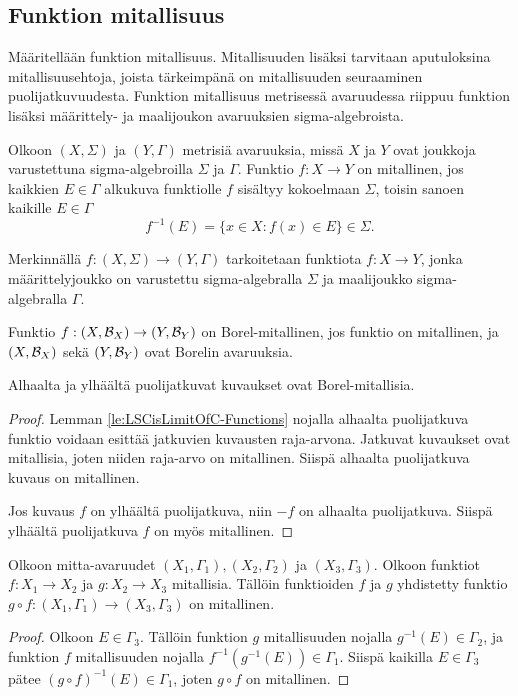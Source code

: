 \documentclass[12pt,oneside,a4paper]{amsbook} %
\begin{document}
\subsection{Funktion mitallisuus}
Määritellään funktion mitallisuus. Mitallisuuden lisäksi tarvitaan aputuloksina mitallisuusehtoja, joista tärkeimpänä on mitallisuuden seuraaminen puolijatkuvuudesta. Funktion mitallisuus metrisessä avaruudessa riippuu funktion lisäksi määrittely- ja maalijoukon avaruuksien sigma-algebroista.

\begin{definition}\label{def:measurable}
    Olkoon $(X, \Sigma)$ ja $(Y, \Gamma)$ metrisiä avaruuksia, missä $X$ ja $Y$ ovat joukkoja varustettuna sigma-algebroilla $\Sigma$ ja $\Gamma$. Funktio $f: X \to Y$ on mitallinen, jos kaikkien $E\in \Gamma$ alkukuva funktiolle $f$ sisältyy kokoelmaan $\Sigma$, toisin sanoen kaikille $E \in \Gamma$
    \begin{equation*}
        f^{-1}(E) = \{x \in X : f(x) \in E\} \in \Sigma.  
    \end{equation*}
\end{definition}
Merkinnällä $f: (X, \Sigma) \to (Y, \Gamma)$ tarkoitetaan funktiota $f:X \to Y$, jonka määrittelyjoukko on varustettu sigma-algebralla $\Sigma$ ja maalijoukko sigma-algebralla $\Gamma$.
\begin{definition}
Funktio $f:(X, \mathcal{B}_X) \to (Y, \mathcal{B}_Y)$ on Borel-mitallinen, jos funktio on mitallinen, ja $(X, \mathcal{B}_X)$ sekä $(Y, \mathcal{B}_Y)$ ovat Borelin avaruuksia.
\end{definition}
\begin{corollary}\label{co:LSCimpliesMeasurable}
    Alhaalta ja ylhäältä puolijatkuvat kuvaukset ovat Borel-mitallisia.
\end{corollary}
\begin{proof}
    Lemman \ref{le:LSCisLimitOfC-Functions} nojalla alhaalta puolijatkuva funktio voidaan esittää jatkuvien kuvausten raja-arvona. Jatkuvat kuvaukset ovat mitallisia, joten niiden raja-arvo on mitallinen. Siispä alhaalta puolijatkuva kuvaus on mitallinen. 
    
    Jos kuvaus $f$ on ylhäältä puolijatkuva, niin $-f$ on alhaalta puolijatkuva. Siispä ylhäältä puolijatkuva $f$ on myös mitallinen.
\end{proof}

\begin{lemma}
    Olkoon mitta-avaruudet $(X_1, \Gamma_1), (X_2, \Gamma_2)$ ja $(X_3, \Gamma_3)$. Olkoon funktiot $f:X_1 \to X_2$ ja $g:X_2 \to X_3$ mitallisia. Tällöin funktioiden $f$ ja $g$ yhdistetty funktio $g \circ f:(X_1, \Gamma_1) \to (X_3, \Gamma_3)$ on mitallinen.
\end{lemma}
\begin{proof}
    Olkoon $E \in \Gamma_3$. Tällöin funktion $g$ mitallisuuden nojalla $g^{-1}(E) \in \Gamma_2$, ja funktion $f$ mitallisuuden nojalla $f^{-1}(g^{-1}(E)) \in \Gamma_1$. Siispä kaikilla $E \in \Gamma_3$ pätee $(g\circ f)^{-1}(E) \in \Gamma_1$, joten $g\circ f$ on mitallinen.
\end{proof}
\end{document}
